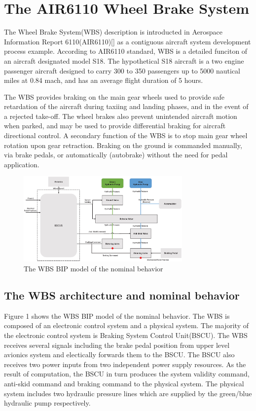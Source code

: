 

\section{The AIR6110 Wheel Brake System}

The Wheel Brake System(WBS) description is introducted in Aerospace Information Report 6110(AIR6110)[] as a contiguous aircraft system development process example. According to AIR6110 standard, WBS is a detailed funciton of an aircraft designated model S18. The hypothetical S18 aircraft is a two engine passenger aircraft designed to carry 300 to 350 passengers up to 5000 nautical miles at
0.84 mach, and has an average flight duration of 5 hours.

The WBS provides braking on the main gear wheels used to provide safe retardation of the aircraft during taxiing and landing phases, and in the event of a rejected take-off. The wheel brakes also prevent unintended aircraft motion when parked, and may be used to provide differential braking for aircraft directional control. A secondary function of the WBS is to stop main gear wheel rotation upon gear retraction. Braking on the ground is commanded manually, via brake pedals, or automatically (autobrake) without the need for pedal application.

\begin{figure}[htbp]
	\centerline{\includegraphics[width=85mm]{figure/Nominal.eps}}
	\caption{The WBS BIP model of the nominal behavior}
	\label{WBS_BIP_Nominal}
\end{figure}

\subsection{The WBS architecture and nominal behavior}

Figure 1 shows the WBS BIP model of the nominal behavior. The WBS is composed of an electronic control system and a physical system. The majority of the electronic control system is Braking System Control Unit(BSCU). The WBS receives several signals including the brake pedal position from upper level avionics system and electically forwards them to the BSCU. The BSCU also receives two power inputs from two independent power supply resources. As the result of computation, the BSCU in turn produces the system validity command, anti-skid command and braking command to the physical system. The physical system includes two hydraulic pressure lines which are supplied by the green/blue hydraulic pump respectively.

